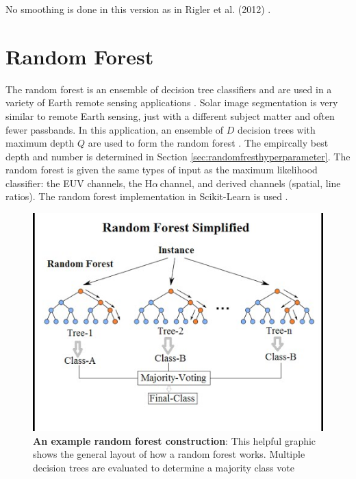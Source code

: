 \documentclass[twoside]{report}
\newcommand{\halpha}{H$\alpha$\,}
\newcommand{\todo}[1]{{\color{red}{\textbf{#1}}}}
\begin{document}
No smoothing is done in this version as in Rigler et al. (2012) \cite{rigler:2012}. 

\section{Random Forest}
The random forest is an ensemble of decision tree classifiers and are used in a variety of Earth remote sensing applications \cite{puissant2014object, salas2016multispectral, clark2016mapping, kulkarni2017multispectral, lowe:2015}. Solar image segmentation is very similar to remote Earth sensing, just with a different subject matter and often fewer passbands. In this application, an ensemble of $D$ decision trees with maximum depth $Q$ are used to form the random forest \todo{change to optimal}. The empircally best depth and number is determined in Section \ref{sec:randomfresthyperparameter}. The random forest is given the same types of input as the maximum likelihood classifier: the EUV channels, the \halpha channel, and derived channels (spatial, line ratios). The random forest implementation in Scikit-Learn is used \cite{scikit-learn}. 

\begin{figure}[ht]
  \begin{center}
    \includegraphics[scale=0.8]{rand-forest.jpg}
    \caption{{\bf An example random forest construction}: This helpful graphic shows the general layout of how a random forest works. Multiple decision trees are evaluated to determine a majority class vote \cite{randforestgraphic}}
 \end{center}
\end{figure}
\end{document}
